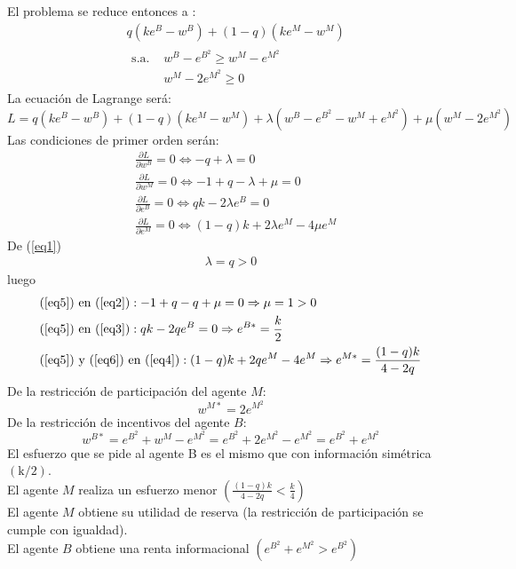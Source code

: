 \begin{enumerate}[a)]
	El problema se reduce entonces a :
	\begin{align*}
		& q\left(ke^{B}-w^{B}\right)+(1-q)\left(ke^{M}-w^{M}\right)\\
		& \begin{array}{ll}
			\text{s.a. } & w^{B}-e^{B^{2}} \geq w^{M}-e^{M^{2}} \\
			& w^{M}-2 e^{M^{2}} \geq 0
		\end{array}
	\end{align*}
	La ecuación de Lagrange será:
	$$ L=q\left(k e^{B}-w^{B}\right)+(1-q)\left(k e^{M}-w^{M}\right)+\lambda\left(w^{B}-e^{B^{2}}-w^{M}+e^{M^{2}}\right)+\mu\left(w^{M}-2e^{M^{2}}\right) $$
	Las condiciones de primer orden serán:
	\begin{align} 
		&\frac{\partial L}{\partial w^{B}}=0 \Leftrightarrow -q+\lambda=0 \label{eq1}\\
		&\frac{\partial L}{\partial w^{M}}=0 \Leftrightarrow -1+q-\lambda+\mu=0 \label{eq2}\\
		&\frac{\partial L}{\partial e^{B}}=0 \Leftrightarrow qk-2 \lambda e^{B}=0 \label{eq3}\\
		&\frac{\partial L}{\partial e^{M}}=0 \Leftrightarrow (1-q) k+2 \lambda e^{M}-4 \mu e^{M} \label{eq4}
	\end{align}
	De (\ref{eq1})
	\begin{gather}
		\lambda=q>0 \label{eq5}
	\end{gather}
	luego
	\begin{align}
		&\text{(\ref{eq5}) en (\ref{eq2})}: -1+q-q+\mu=0 \Rightarrow \mu=1>0 \notag\\
		&\text{(\ref{eq5}) en (\ref{eq3})}: qk-2qe^{B}=0 \Rightarrow e^{B*}=\frac{k}{2} \label{eq6}\\
		&\text{(\ref{eq5}) y (\ref{eq6}) en (\ref{eq4})}: (1-q)k+2qe^{M}-4e^{M} \Rightarrow e^{M*}=\frac{(1-q)k}{4-2q} \notag
	\end{align}
	De la restricción de participación del agente $M$:
	$$w^{M*}=2e^{M^{2}}$$
	De la restricción de incentivos del agente $B$:
	$$w^{B*}=e^{B^{2}}+w^{M}-e^{M^{2}}=e^{B^{2}}+2 e^{M^{2}}-e^{M^{2}}=e^{B^{2}}+e^{M^{2}}$$
	El esfuerzo que se pide al agente B es el mismo que con información simétrica $(\mathrm{k} / 2)$.\\
	
	El agente $M$ realiza un esfuerzo menor $\left(\frac{(1-q)k}{4-2q}<\frac{k}{4}\right)$\\
	
	El agente $M$ obtiene su utilidad de reserva (la restricción de participación se cumple con igualdad).\\
	
	El agente $B$ obtiene una renta informacional $\left(e^{B^{2}}+e^{M^{2}}>e^{B^{2}}\right)$
\end{enumerate}